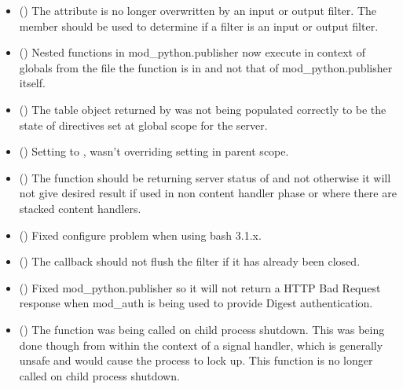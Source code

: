   \begin{itemize}
    \item
      ()
      The  attribute is no longer overwritten by an input
      or output filter. The  member should be used
      to determine if a filter is an input or output filter.
    \item
      ()
      Nested  functions in mod_python.publisher now execute
      in context of globals from the file the function is in and not that
      of mod_python.publisher itself.
    \item
      ()
      The table object returned by  was not
      being populated correctly to be the state of directives set at global
      scope for the server.
    \item
      ()
      Setting  to , wasn't overriding 
      setting in parent scope.
    \item
      ()
      The  function should be returning server status of
       and not  otherwise it will not give
      desired result if used in non content handler phase or where there are
      stacked content handlers.
    \item
      ()
      Fixed configure problem when using bash 3.1.x.
    \item
      ()
      The  callback should not flush the filter if it
      has already been closed.
    \item
      ()
      Fixed mod_python.publisher so it will not return a HTTP Bad Request
      response when mod_auth is being used to provide Digest authentication.
    \item
      ()
      The  function was being called on child process
      shutdown. This was being done though from within the context of a
      signal handler, which is generally unsafe and would cause the process
      to lock up. This function is no longer called on child process shutdown.
  \end{itemize}

